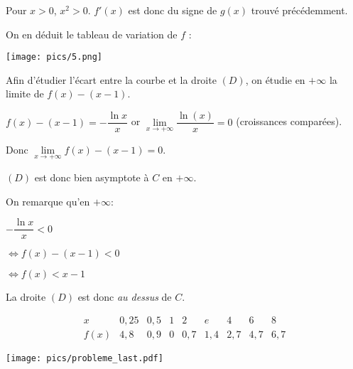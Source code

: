 \documentclass[a4paper,12pt]{scrartcl}
\begin{document}
\question{}

Pour $x > 0$, $x^2 > 0$. $f'(x)$ est donc du signe de $g(x)$ trouvé précédemment. 

On en déduit le tableau de variation de $f$ :

\begin{center}
\texttt{[image: pics/5.png]}
\end{center}

\question{}


Afin d'étudier l'écart entre la courbe et la droite $(D)$, on étudie en $+\infty$ la limite de $f(x) - (x-1)$. 

$f(x) - (x-1) = -\dfrac{\ln x}{x}$ or $\lim\limits_{x\to+\infty} \dfrac{\ln(x)}{x} = 0$ (croissances comparées).

Donc $\lim\limits_{x\to+\infty} f(x) - (x-1) = 0$. 

$(D)$ est donc bien asymptote à $C$ en $+\infty$.


On remarque qu'en $+\infty$:

$-\dfrac{\ln x}{x} < 0$

$\Leftrightarrow f(x) - (x-1) < 0$

$\Leftrightarrow f(x) < x-1$

La droite $(D)$ est donc \emph{au dessus} de $C$.


\subquestion{}

$$
\begin{array}{r|c|c|c|c|c|c|c|c}
x & 0,25 & 0,5 & 1 & 2 & e & 4 & 6 & 8\\
\hline
f(x) & 4,8 & 0,9 & 0 & 0,7 & 1,4 & 2,7 & 4,7 & 6,7
\end{array}
$$

\subquestion{}

\texttt{[image: pics/probleme\_last.pdf]}
\end{document}
